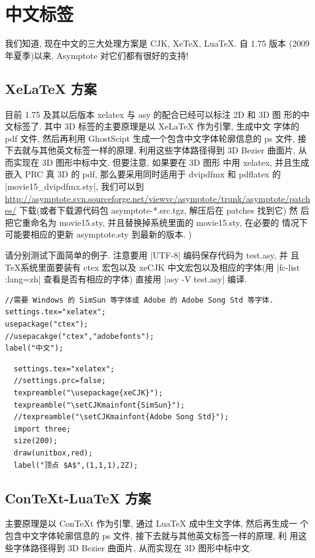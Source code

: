 \documentclass[nofonts,CJKnormalspaces]{ctexbook}[2009/05/20]
\begin{document}
\section{中文标签}
我们知道, 现在中文的三大处理方案是 CJK, XeTeX, LuaTeX. 自 1.75 版本
(2009 年夏季)以来, Asymptote 对它们都有很好的支持!

\subsection{XeLaTeX 方案}
目前 1.75 及其以后版本 xelatex 与 asy 的配合已经可以标注 2D 和 3D 图
形的中文标签了. 其中 3D 标签的主要原理是以 XeLaTeX 作为引擎, 生成中文
字体的 pdf 文件, 然后再利用 GhostScipt 生成一个包含中文字体轮廓信息的
ps 文件, 接下去就与其他英文标签一样的原理, 利用这些字体路径得到 3D
Bezier 曲面片, 从而实现在 3D 图形中标中文.  但要注意, 如果要在 3D 图形
中用 xelatex, 并且生成嵌入 PRC 真 3D 的 pdf, 那么要采用同时适用于
dvipdfmx 和 pdflatex 的 |movie15_dvipdfmx.sty|, 我们可以到
\url{http://asymptote.svn.sourceforge.net/viewvc/asymptote/trunk/asymptote/patches/}
下载(或者下载源代码包 asymptote-*.src.tgz, 解压后在 patches 找到它) 然
后把它重命名为 movie15.sty, 并且替换掉系统里面的 movie15.sty, 在必要的
情况下可能要相应的更新 asymptote.sty 到最新的版本.
\label{movie15:xelatex})

请分别测试下面简单的例子. 注意要用 |UTF-8| 编码保存代码为 test.asy, 并
且 \TeX 系统里面要装有 ctex 宏包以及 xeCJK 中文宏包以及相应的字体(用
|fc-list :lang=zh| 查看是否有相应的字体) 直接用
|asy -V test.asy| 编译.

\begin{lstlisting}
//需要 Windows 的 SimSun 等字体或 Adobe 的 Adobe Song Std 等字体.
settings.tex="xelatex";
usepackage("ctex");
//usepacakge("ctex","adobefonts");
label("中文");
\end{lstlisting}

\begin{lstlisting}
  settings.tex="xelatex";
  //settings.prc=false;
  texpreamble("\usepackage{xeCJK}");
  texpreamble("\setCJKmainfont{SimSun}");
  //texpreamble("\setCJKmainfont{Adobe Song Std}");
  import three;
  size(200);
  draw(unitbox,red);
  label("顶点 $A$",(1,1,1),2Z);
\end{lstlisting}


\subsection{ConTeXt-LuaTeX 方案}
主要原理是以 ConTeXt 作为引擎, 通过 LuaTeX 成中生文字体, 然后再生成一
个包含中文字体轮廓信息的 ps 文件, 接下去就与其他英文标签一样的原理, 利
用这些字体路径得到 3D Bezier 曲面片, 从而实现在 3D 图形中标中文.
\end{document}
